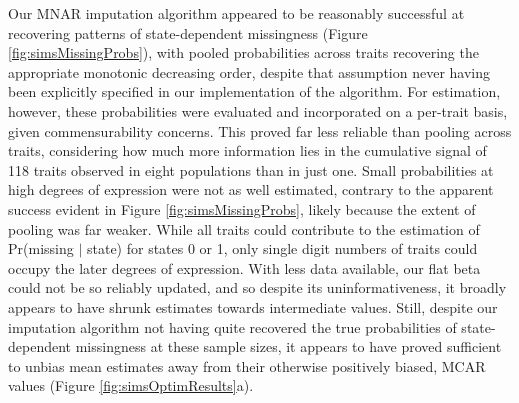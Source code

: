 Our MNAR imputation algorithm appeared to be reasonably successful at recovering patterns of state-dependent missingness (Figure \ref{fig:simsMissingProbs}), with pooled probabilities across traits recovering the appropriate monotonic decreasing order, despite that assumption never having been explicitly specified in our implementation of the algorithm. For estimation, however, these probabilities were evaluated and incorporated on a per-trait basis, given commensurability concerns. This proved far less reliable than pooling across traits, considering how much more information lies in the cumulative signal of 118 traits observed in eight populations than in just one. Small probabilities at high degrees of expression were not as well estimated, contrary to the apparent success evident in Figure \ref{fig:simsMissingProbs}, likely because the extent of pooling was far weaker. While all traits could contribute to the estimation of Pr(missing $\vert$ state) for states 0 or 1, only single digit numbers of traits could occupy the later degrees of expression. With less data available, our flat beta could not be so reliably updated, and so despite its uninformativeness, it broadly appears to have shrunk estimates towards intermediate values. Still, despite our imputation algorithm not having quite recovered the true probabilities of state-dependent missingness at these sample sizes, it appears to have proved sufficient to unbias mean estimates away from their otherwise positively biased, MCAR values (Figure \ref{fig:simsOptimResults}a).

